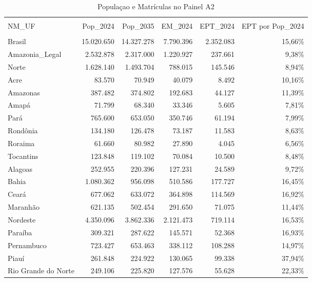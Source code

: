 \begin{table}[!htbp] \centering 
	\caption{Populaçao e Matrículas no Painel A2}
	\label{tab:popematri}
	\footnotesize
	\begin{tabular}{@{\extracolsep{5pt}} lrrrrr} 
		\\[-1.8ex]\hline 
		\hline \\[-1.8ex] 
		NM\_UF & Pop\_2024 & Pop\_2035 & EM\_2024 & EPT\_2024 & EPT por Pop\_2024 \\ 
		\hline \\[-1.8ex] 
		Brasil & 15.020.650 & 14.327.278 & 7.790.396 & 2.352.083 & 15,66\% \\ 
		Amazonia\_Legal &  2.532.878 &  2.317.000 & 1.220.927 &   237.661 &  9,38\% \\ 
		Norte &  1.628.140 &  1.493.704 &   788.015 &   145.546 &  8,94\% \\ 
		Acre &     83.570 &     70.949 &    40.079 &     8.492 & 10,16\% \\ 
		Amazonas &    387.482 &    374.802 &   192.683 &    44.127 & 11,39\% \\ 
		Amapá &     71.799 &     68.340 &    33.346 &     5.605 &  7,81\% \\ 
		Pará &    765.600 &    653.050 &   350.746 &    61.194 &  7,99\% \\ 
		Rondônia &    134.180 &    126.478 &    73.187 &    11.583 &  8,63\% \\ 
		Roraima &     61.660 &     80.982 &    27.890 &     4.045 &  6,56\% \\ 
		Tocantins &    123.848 &    119.102 &    70.084 &    10.500 &  8,48\% \\ 
		Alagoas &    252.955 &    220.396 &   127.231 &    24.589 &  9,72\% \\ 
		Bahia &  1.080.362 &    956.098 &   510.586 &   177.727 & 16,45\% \\ 
		Ceará &    677.062 &    633.072 &   364.898 &   114.569 & 16,92\% \\ 
		Maranhão &    621.135 &    502.454 &   291.650 &    71.075 & 11,44\% \\ 
		Nordeste &  4.350.096 &  3.862.336 & 2.121.473 &   719.114 & 16,53\% \\ 
		Paraíba &    309.321 &    287.622 &   145.571 &    52.368 & 16,93\% \\ 
		Pernambuco &    723.427 &    653.463 &   338.112 &   108.288 & 14,97\% \\ 
		Piauí &    261.848 &    224.922 &   130.065 &    99.338 & 37,94\% \\ 
		Rio Grande do Norte &    249.106 &    225.820 &   127.576 &    55.628 & 22,33\% \\ 

\end{tabular}
\end{table}
